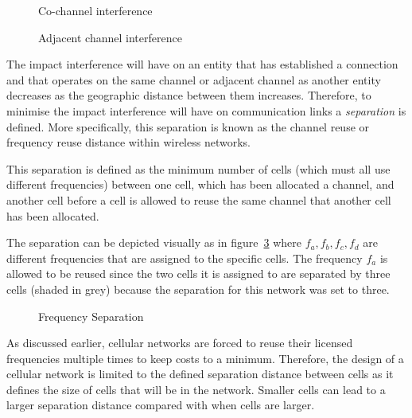 \begin{figure}[H]
	\begin{centering}
	
	\caption{Co-channel interference}
	\label{fig:sameinterference}
	\end{centering}
\end{figure}
\begin{figure}[H]
	\begin{centering}
	
	\caption{Adjacent channel interference}
	\label{fig:adjacentinterference}
	\end{centering}
\end{figure}

The impact interference will have on an entity that has established a connection and that operates on the same channel or adjacent channel as another entity decreases as the geographic distance between them increases\cite{InterferenceOrientatedFAP}. Therefore, to minimise the impact interference will have on communication links a \emph{separation} is defined\cite{WirelessCommunications}. More specifically, this separation is known as the channel reuse or frequency reuse distance within wireless networks\cite{WirelessCommunications}.

This separation is defined as the minimum number of cells (which must all use different frequencies) between one cell, which has been allocated a channel, and another cell before a cell is allowed to reuse the same channel that another cell has been allocated\cite{WirelessCommunications,InterferenceOrientatedFAP}. 

The separation can be depicted visually as in figure~\ref{fig:seperationgraph} where $f_a,f_b,f_c,f_d$ are different frequencies that are assigned to the specific cells. The frequency $f_a$ is allowed to be reused since the two cells it is assigned to are separated by three cells (shaded in grey) because the separation for this network was set to three.

\begin{figure}[H]
	\begin{centering}
	
	\caption{Frequency Separation}
	\label{fig:seperationgraph}
	\end{centering}
\end{figure}


As discussed earlier, cellular networks are forced to reuse their licensed frequencies multiple times to keep costs to a minimum. Therefore, the design of a cellular network is limited to the defined separation distance between cells as it defines the size of cells that will be in the network\cite{Eisenblatter,InterferenceOrientatedFAP}. Smaller cells can lead to a larger separation distance compared with when cells are larger\cite{WirelessCommunications,WirelessDigitalCommunications}.

